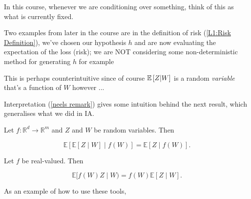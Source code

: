\documentclass[11pt]{scrartcl}
\begin{document}
\begin{remark}
In this course, whenever we are conditioning over something, think of this as what is currently fixed.

Two examples from later in the course are in the definition of risk (\ref{L1:Risk Definition}), we've chosen our hypothesis $h$ and are now evaluating the expectation of the loss (risk); we are NOT considering some non-deterministic method for generating $h$ for example

This is perhaps counterintuitive since of course $\mathbb{E} \left[ Z|W \right]$ is a random \textit{variable} that's a function of $W$ however ...
\end{remark}

Interpretation (\ref{neels remark}) gives some intuition behind the next result, which generalises what we did in IA.

\begin{theorem}
Let $f : \mathbb{R}^d \rightarrow \mathbb{R}^m$ and $Z$ and $W$ be random variables. Then 

\begin{equation}
\mathbb{E}[\mathbb{E}[Z\mid W]\mid f(W)] = \mathbb{E}[Z\mid f(W)].
\end{equation}
\end{theorem}

\begin{theorem}
Let $f$ be real-valued. Then

\begin{equation}
    \mathbb{E}[f(W)Z\mid W) = f(W)\mathbb{E}[Z\mid W].
\end{equation}
\label{L1: Taking out}
\end{theorem}

As an example of how to use these tools,
\end{document}
